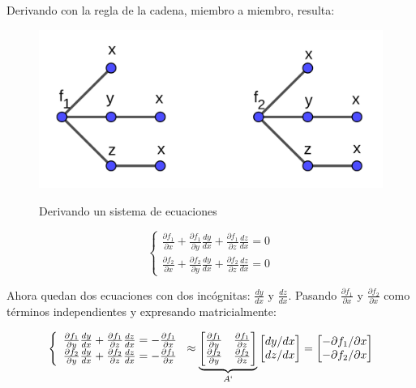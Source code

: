 \documentclass{article}
\begin{document}
Derivando con la regla de la cadena, miembro a miembro, resulta:

\begin{figure}[h]
\caption{Derivando un sistema de ecuaciones}
\includegraphics[scale=1]{img/teo_fig009_tcd.png} 
\centering
\label{fig:tcd}
\end{figure}

\begin{equation}
\left\{
\begin{array}{ll}
\frac{\partial f_1}{\partial x} + \frac{\partial f_1}{\partial y} \frac{dy}{dx} + \frac{\partial f_1}{\partial z} \frac{dz}{dx} = 0 \\
\frac{\partial f_2}{\partial x} + \frac{\partial f_2}{\partial y} \frac{dy}{dx} + \frac{\partial f_2}{\partial z} \frac{dz}{dx} = 0
\end{array}
\right.
\end{equation}

Ahora quedan dos ecuaciones con dos incógnitas: $\frac{dy}{dx}$ y $\frac{dz}{dx}$. Pasando $\frac{\partial f_1}{\partial x}$ y $\frac{\partial f_2}{\partial x}$ como términos independientes y expresando matricialmente:

\begin{equation}
\left\{
\begin{array}{ll}
\frac{\partial f_1}{\partial y} \frac{dy}{dx} + \frac{\partial f_1}{\partial z} \frac{dz}{dx} = -\frac{\partial f_1}{\partial x} \\
\frac{\partial f_2}{\partial y} \frac{dy}{dx} + \frac{\partial f_2}{\partial z} \frac{dz}{dx} = -\frac{\partial f_1}{\partial x}
\end{array}
\right. \approx 
\underbrace{
\begin{bmatrix}
\frac{\partial f_1}{\partial y} & \frac{\partial f_1}{\partial z} \\
\frac{\partial f_2}{\partial y} & \frac{\partial f_2}{\partial z}
\end{bmatrix}
}_{A`}
\begin{bmatrix}
dy/dx \\
dz/dx
\end{bmatrix} = 
\begin{bmatrix}
-\partial f_1/ \partial x \\
-\partial f_2/ \partial x
\end{bmatrix}
\end{equation}
\end{document}
